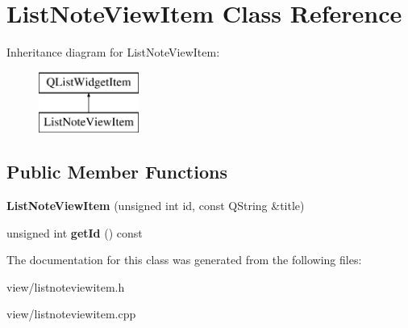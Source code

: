 \hypertarget{class_list_note_view_item}{\section{List\-Note\-View\-Item Class Reference}
\label{class_list_note_view_item}
}
Inheritance diagram for List\-Note\-View\-Item\-:\begin{figure}[H]
\begin{center}
\leavevmode
\includegraphics[height=2.000000cm]{class_list_note_view_item}
\end{center}
\end{figure}
\subsection*{Public Member Functions}
\begin{DoxyCompactItemize}
\item 
\hypertarget{class_list_note_view_item_a209ddecc94aa3d4afec7d79bd0583c07}{{\bfseries List\-Note\-View\-Item} (unsigned int id, const Q\-String \&title)}\label{class_list_note_view_item_a209ddecc94aa3d4afec7d79bd0583c07}

\item 
\hypertarget{class_list_note_view_item_a8835ae8de761810ea4ae8617fc6a73c4}{unsigned int {\bfseries get\-Id} () const }\label{class_list_note_view_item_a8835ae8de761810ea4ae8617fc6a73c4}

\end{DoxyCompactItemize}


The documentation for this class was generated from the following files\-:\begin{DoxyCompactItemize}
\item 
view/listnoteviewitem.\-h\item 
view/listnoteviewitem.\-cpp\end{DoxyCompactItemize}
